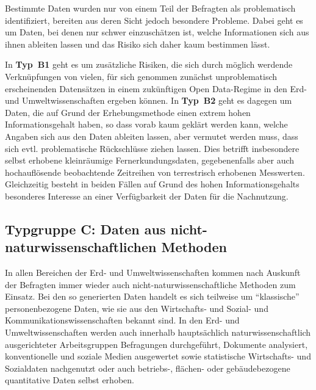 \documentclass[a4paper,
fontsize=11pt,
oneside,
numbers=noperiodatend,
parskip=half-,
bibliography=totoc,
final
]{scrartcl}
\begin{document}
Bestimmte Daten wurden nur von einem Teil der Befragten als
problematisch identifiziert, bereiten aus deren Sicht jedoch besondere
Probleme. Dabei geht es um Daten, bei denen nur schwer einzuschätzen
ist, welche Informationen sich aus ihnen ableiten lassen und das Risiko
sich daher kaum bestimmen lässt.

In \textbf{Typ~B1} geht es um zusätzliche Risiken, die sich durch
möglich werdende Verknüpfungen von vielen, für sich genommen zunächst
unproblematisch erscheinenden Datensätzen in einem zukünftigen Open
Data-Regime in den Erd- und Umweltwissenschaften ergeben können. In
\textbf{Typ~B2} geht es dagegen um Daten, die auf Grund der
Erhebungsmethode einen extrem hohen Informationsgehalt haben, so dass
vorab kaum geklärt werden kann, welche Angaben sich aus den Daten
ableiten lassen, aber vermutet werden muss, dass sich evtl.
problematische Rückschlüsse ziehen lassen. Dies betrifft insbesondere
selbst erhobene kleinräumige Fernerkundungsdaten, gegebenenfalls aber
auch hochauflösende beobachtende Zeitreihen von terrestrisch erhobenen
Messwerten. Gleichzeitig besteht in beiden Fällen auf Grund des hohen
Informationsgehalts besonderes Interesse an einer Verfügbarkeit der
Daten für die Nachnutzung.

\hypertarget{typgruppe-c-daten-aus-nicht-naturwissenschaftlichen-methoden}{%
\subsection{Typgruppe C: Daten aus nicht-naturwissenschaftlichen
Methoden}\label{typgruppe-c-daten-aus-nicht-naturwissenschaftlichen-methoden}}

In allen Bereichen der Erd- und Umweltwissenschaften kommen nach
Auskunft der Befragten immer wieder auch nicht-naturwissenschaftliche
Methoden zum Einsatz. Bei den so generierten Daten handelt es sich
teilweise um \enquote{klassische} personenbezogene Daten, wie sie aus
den Wirtschafts- und Sozial- und Kommunikationswissenschaften bekannt
sind. In den Erd- und Umweltwissenschaften werden auch innerhalb
hauptsächlich naturwissenschaftlich ausgerichteter Arbeitsgruppen
Befragungen durchgeführt, Dokumente analysiert, konventionelle und
soziale Medien ausgewertet sowie statistische Wirtschafts- und
Sozialdaten nachgenutzt oder auch betriebs-, flächen- oder
gebäudebezogene quantitative Daten selbst erhoben.
\end{document}
